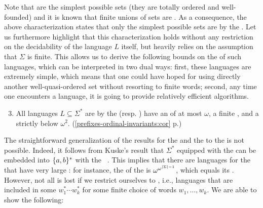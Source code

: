 Note that  are the simplest possible  sets
(they are totally ordered and well-founded) and it is known that finite unions
of  sets are . As a consequence,
the above characterization states that only the simplest possible
 sets are  by the . Let us furthermore highlight that this characterization holds
without any restriction on the decidability of the language $L$ itself, but
heavily relies on the assumption that $\Sigma$ is finite. This allows us to
derive the following bounds on the  of such
 languages, which can be interpreted in two dual ways:
first, these languages are extremely simple, which means that one could have
hoped for using directly another well-quasi-ordered set without resorting to
finite words; second, any time one encounters a 
language, it is going to provide relatively efficient algorithms.
{
\renewcommand{\labelenumi}{R\arabic{enumi}}
\begin{enumerate}
    \setcounter{enumi}{2}
    \item All languages $L \subseteq \Sigma^*$ are 
         by the  
        (resp. ) have an  of at most $\omega$,
        a finite , and a  strictly
        below $\omega^2$.
        \hfill (\cref{prefixes-ordinal-invariants:cor} p.\pageref{prefixes-ordinal-invariants:cor})
\end{enumerate}
}



\AP The straightforward generalization of the results for the  and the  to the  is not
possible. Indeed, it follows from Kuske's result that $\Sigma^*$ equipped with
the  can be embedded into $\{ a,b \}^*$ with the ~\cite[Lemma 5.1]{DBLP:journals/ita/Kuske06}. This implies that there
are  languages for the  that have
very large : for instance, the 
of the  is $\omega^{\omega^{\left| \Sigma \right| - 1}}$, which
equals its  \cite[Corollary 3.9, Theorem 4.21]{DZSCSC20}.
However, not all is lost if we restrict ourselves to ,
i.e., languages that are included in some $w_1^* \cdots w_k^*$ for some finite
choice of words $w_1, \ldots, w_k$. We are able to show the following:

